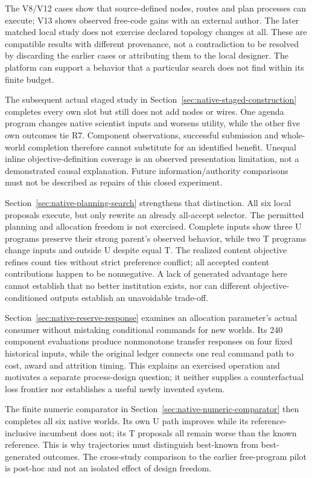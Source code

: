 The V8/V12 cases show that source-defined nodes, routes and plan processes can
execute; V13 shows observed free-code gains with an external author. The later
matched local study does not exercise declared topology changes at all.
These are compatible results with different provenance, not a contradiction
to be resolved by discarding the earlier cases or attributing them to the
local designer. The platform can support a behavior that a particular search
does not find within its finite budget.

The subsequent actual staged study in Section~\ref{sec:native-staged-construction}
completes every own slot but still does not add nodes or wires. One agenda
program changes native scientist inputs and worsens utility, while the other
five own outcomes tie R7. Component observations, successful submission and
whole-world completion therefore cannot substitute for an identified benefit.
Unequal inline objective-definition coverage is an observed presentation
limitation, not a demonstrated causal explanation. Future information/authority
comparisons must not be described as repairs of this closed experiment.

Section~\ref{sec:native-planning-search} strengthens that distinction. All six
local proposals execute, but only rewrite an already all-accept selector.
The permitted planning and allocation freedom is not exercised. Complete
inputs show three U programs preserve their strong parent's observed behavior,
while two T programs change inputs and outside U despite equal T. The realized
content objective refines count ties without strict preference conflict; all
accepted content contributions happen to be nonnegative. A lack of generated
advantage here cannot establish that no better institution exists, nor can
different objective-conditioned outputs establish an unavoidable trade-off.

Section~\ref{sec:native-reserve-response} examines an allocation parameter's
actual consumer without mistaking conditional commands for new worlds. Its
240 component evaluations produce nonmonotone transfer responses on four
fixed historical inputs, while the original ledger connects one real command
path to cost, award and attrition timing. This explains an exercised operation
and motivates a separate process-design question; it neither supplies a
counterfactual loss frontier nor establishes a useful newly invented system.

The finite numeric comparator in Section~\ref{sec:native-numeric-comparator}
then completes all six native worlds. Its own U path improves while its
reference-inclusive incumbent does not; its T proposals all remain worse than
the known reference. This is why trajectories must distinguish best-known
from best-generated outcomes. The cross-study comparison to the earlier
free-program pilot is post-hoc and not an isolated effect of design freedom.


